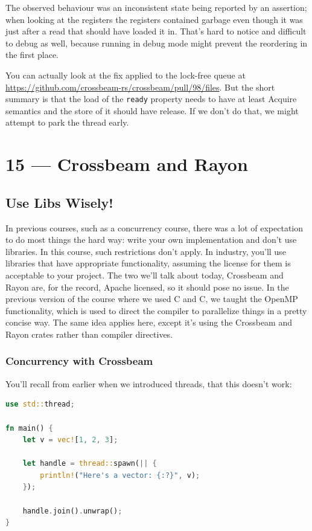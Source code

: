 \documentclass[a4paper]{report}
\newcommand{\CPP}{C\nolinebreak\hspace{-.05em}\raisebox{.4ex}{\tiny\bf +}\nolinebreak\hspace{-.10em}\raisebox{.4ex}{\tiny\bf +}}
\def\CPP{{C\nolinebreak[4]\hspace{-.05em}\raisebox{.4ex}{\tiny\bf ++}}}
\begin{document}
The observed behaviour was an inconsistent state being reported by an assertion; when looking at the registers the registers contained garbage even though it was just after a read that should have loaded it in. That's hard to notice and difficult to debug as well, because running in debug mode might prevent the reordering in the first place.

You can actually look at the fix applied to the lock-free queue at \url{https://github.com/crossbeam-rs/crossbeam/pull/98/files}. But the short summary is that the load of the \texttt{ready} property needs to have at least Acquire semantics and the store of it should have release.  If we don't do that, we might attempt to park the thread early. 









\chapter*{15 --- Crossbeam and Rayon}


\section*{Use Libs Wisely!}
In previous courses, such as a concurrency course, there was a lot of expectation to do most things the hard way: write your own implementation and don't use libraries. In this course, such restrictions don't apply. In industry, you'll use libraries that have appropriate functionality, assuming the license for them is acceptable to your project. The two we'll talk about today, Crossbeam and Rayon are, for the record, Apache licensed, so it should pose no issue. In the previous version of the course where we used C and \CPP, we taught the OpenMP functionality, which is used to direct the compiler to parallelize things in a pretty concise way. The same idea applies here, except it's using the Crossbeam and Rayon crates rather than compiler directives.


\subsection*{Concurrency with Crossbeam} 

You'll recall from earlier when we introduced threads, that this doesn't work:
\begin{lstlisting}[language=Rust]
use std::thread;

fn main() {
    let v = vec![1, 2, 3];

    let handle = thread::spawn(|| {
        println!("Here's a vector: {:?}", v);
    });

    handle.join().unwrap();
}
\end{lstlisting}
\end{document}
